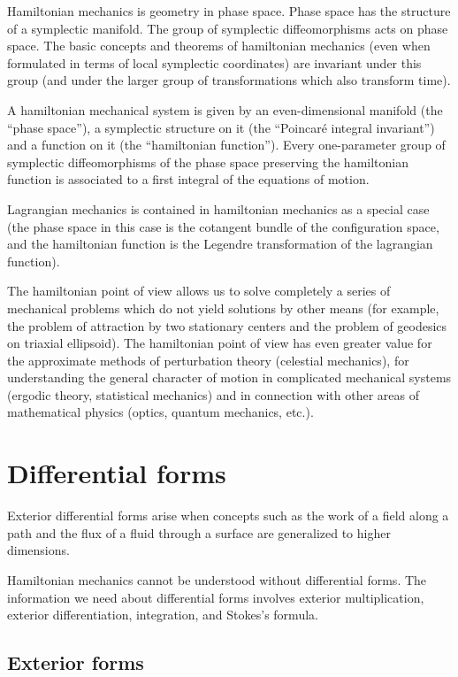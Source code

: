 \documentclass[leqno]{report}
\numberwithin{equation}{section}
\theoremstyle{plain}
\theoremstyle{definition}
\theoremstyle{remark}
\theoremstyle{smallcap}
\numberwithin{prob}{section}
\begin{document}
Hamiltonian mechanics is geometry in phase space.
%
Phase space has the structure of a symplectic manifold.
%
The group of symplectic diffeomorphisms acts on phase space.
%
The basic concepts and theorems of hamiltonian mechanics
(even when formulated in terms of local symplectic coordinates)
are invariant under this group
(and under the larger group of transformations which also transform time).

A hamiltonian mechanical system is given by an even-dimensional
manifold (the ``phase space''),
a symplectic structure on it (the ``Poincar\'e integral invariant'')
and a function on it (the ``hamiltonian function'').
%
Every one-parameter group of symplectic diffeomorphisms of the phase space
preserving the hamiltonian function is associated to a first integral of
the equations of motion.

Lagrangian mechanics is contained in hamiltonian mechanics as a special
case (the phase space in this case is the cotangent bundle
of the configuration space, and the hamiltonian function is
the Legendre transformation of the lagrangian function).

The hamiltonian point of view allows us to solve completely a series of
mechanical problems which do not yield solutions by other means
(for example, the problem of attraction by two stationary centers
and the problem of geodesics on triaxial ellipsoid).
%
The hamiltonian point of view has even greater value for the approximate
methods of perturbation theory (celestial mechanics),
for understanding the general character of motion
in complicated mechanical systems (ergodic theory, statistical mechanics)
and in connection with other areas of mathematical physics
(optics, quantum mechanics, etc.).

\chapter{Differential forms}

Exterior differential forms arise when concepts such as the work
of a field along a path and the flux of a fluid through a surface
are generalized to higher dimensions.

Hamiltonian mechanics cannot be understood without differential forms.
%
The information we need about differential forms involves
exterior multiplication,
exterior differentiation,
integration, and Stokes's formula.


\section{Exterior forms}
\end{document}
